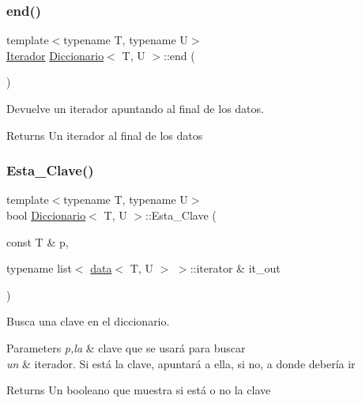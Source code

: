 \subsubsection{\texorpdfstring{end()}{end()}}
{\footnotesize\ttfamily template$<$typename T, typename U$>$ \\
\hyperlink{classDiccionario_1_1Iterador}{Iterador} \hyperlink{classDiccionario}{Diccionario}$<$ T, U $>$\+::end (\begin{DoxyParamCaption}{ }\end{DoxyParamCaption})\hspace{0.3cm}{\ttfamily [inline]}}



Devuelve un iterador apuntando al final de los datos. 

\begin{DoxyReturn}{Returns}
Un iterador al final de los datos 
\end{DoxyReturn}
\mbox{\label{classDiccionario_aed08682f43af8f4537c6a88211bb225a}} 
\subsubsection{\texorpdfstring{Esta\+\_\+\+Clave()}{Esta\_Clave()}}
{\footnotesize\ttfamily template$<$typename T, typename U$>$ \\
bool \hyperlink{classDiccionario}{Diccionario}$<$ T, U $>$\+::Esta\+\_\+\+Clave (\begin{DoxyParamCaption}\item[{const T \&}]{p,  }\item[{typename list$<$ \hyperlink{structdata}{data}$<$ T, U $>$ $>$\+::iterator \&}]{it\+\_\+out }\end{DoxyParamCaption})}



Busca una clave en el diccionario. 


\begin{DoxyParams}{Parameters}
{\em p,la} & clave que se usará para buscar \\
\hline
{\em un} & iterador. Si está la clave, apuntará a ella, si no, a donde debería ir \\
\hline
\end{DoxyParams}
\begin{DoxyReturn}{Returns}
Un booleano que muestra si está o no la clave 
\end{DoxyReturn}
\mbox{\label{classDiccionario_ad262cd8d8e11286beecfa4851ec2c948}} 
